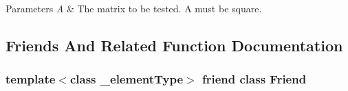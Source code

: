 \begin{DoxyParams}{Parameters}
{\em A} & The matrix to be tested. A must be square. \\
\hline
\end{DoxyParams}


\subsection{Friends And Related Function Documentation}
\hypertarget{classnmr_is_orthonormal_dynamic_data_a7f8321d57e81bc613d5dbef3410ba70e}{
\subsubsection[{Friend}]{\setlength{\rightskip}{0pt plus 5cm}template$<$class \-\_\-element\-Type$>$ friend class {\bf Friend}\hspace{0.3cm}{\ttfamily [friend]}}}\label{classnmr_is_orthonormal_dynamic_data_a7f8321d57e81bc613d5dbef3410ba70e}



